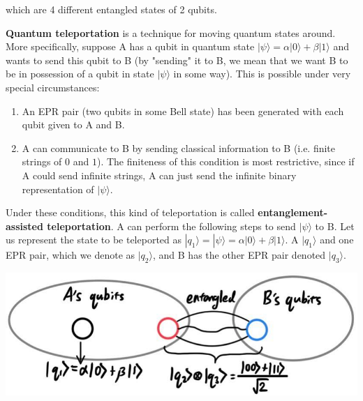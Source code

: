 \documentclass{article}
\theoremstyle{definition}
\begin{document}
    which are 4 different entangled states of 2 qubits.

    \textbf{Quantum teleportation} is a technique for moving quantum states around. More specifically, suppose A has a qubit in quantum state $|\psi \rangle = \alpha |0\rangle + \beta |1 \rangle$ and wants to send this qubit to B (by "sending" it to B, we mean that we want B to be in possession of a qubit in state $|\psi \rangle$ in some way). This is possible under very special circumstances:

    \begin{enumerate}
      \item An EPR pair (two qubits in some Bell state) has been generated with each qubit given to A and B.

      \item A can communicate to B by sending classical information to B (i.e. finite strings of $0$ and $1$). The finiteness of this condition is most restrictive, since if A could send infinite strings, A can just send the infinite binary representation of $|\psi\rangle$.
    \end{enumerate}

    Under these conditions, this kind of teleportation is called \textbf{entanglement-assisted teleportation}. A can perform the following steps to send $|\psi \rangle$ to B. Let us represent the state to be teleported as $|q_1 \rangle = |\psi\rangle = \alpha |0\rangle + \beta |1\rangle$. A $|q_1 \rangle$ and one EPR pair, which we denote as $|q_2\rangle$, and B has the other EPR pair denoted $|q_3\rangle$.

    \begin{center}
      \includegraphics[scale=0.3]{img/Quantum_teleportation.jpg}
    \end{center}
\end{document}
